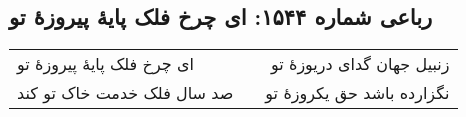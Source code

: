 \begin{center}
\section*{رباعی شماره ۱۵۴۴: ای چرخ فلک پایهٔ پیروزهٔ تو}
\label{sec:1544}
\begin{longtable}{l p{0.5cm} r}
ای چرخ فلک پایهٔ پیروزهٔ تو
&&
زنبیل جهان گدای دریوزهٔ تو
\\
صد سال فلک خدمت خاک تو کند
&&
نگزارده باشد حق یکروزهٔ تو
\\
\end{longtable}
\end{center}
